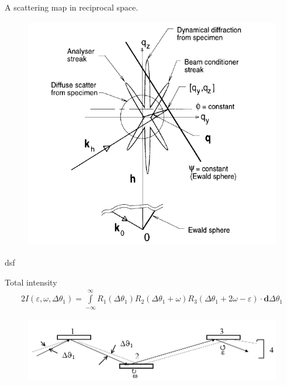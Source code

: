 \documentclass{beamer}
\begin{document}
\begin{frame}{A scattering map in reciprocal space.}
\begin{figure}[h] 
\centering
\includegraphics[height=4in]{graph/qxqz.png} 
\end{figure}
dsf
\end{frame}


\begin{frame}{Total intensity}
\begin{alignat}{2}
I(\varepsilon, \omega,\Delta \theta_1) = 	\int\limits_{-\infty}^\infty R_1 (\Delta \theta_1)
R_2(\Delta \theta_1+\omega)R_3(\Delta \theta_1+2\omega - \varepsilon)\cdot \pmb{d}\Delta \theta_1
\end{alignat}
\begin{figure}[t] 
\centering
\includegraphics[width=5in]{graph/trd.png} 
\end{figure}
\end{frame}
\end{document}
